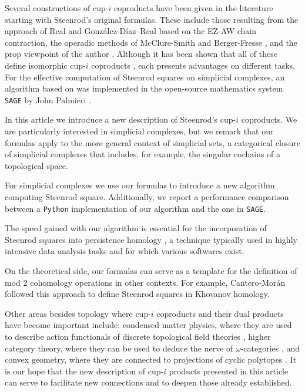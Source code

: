 Several constructions of cup-$i$ coproducts have been given in the literature starting with Steenrod's original formulas.
These include those resulting from the approach of Real \cite{real1996computability} and Gonz\'alez-D\'iaz--Real \cite{gonzalez1999combinatorial, gonzalez2003computation, gonzalez2005hpt} based on the EZ-AW chain contraction, the operadic methods of McClure-Smith \cite{mcclure03cochain} and Berger-Fresse \cite{berger04combinatorial}, and the prop viewpoint of the author \cite{medina2020prop1, medina2018prop2}.
Although it has been shown that all of these define isomorphic cup-$i$ coproducts \cite{medina2018axiomatic}, each presents advantages on different tasks.
For the effective computation of Steenrod squares on simplicial complexes, an algorithm based on \cite{gonzalez1999combinatorial} was implemented in the open-source mathematics system \verb|SAGE| by John Palmieri \cite{sagemath}.

In this article we introduce a new description of Steenrod's cup-$i$ coproducts.
We are particularly interested in simplicial complexes, but we remark that our formulas apply to the more general context of simplicial sets, a categorical closure of simplicial complexes that includes, for example, the singular cochains of a topological space.

For simplicial complexes we use our formulas to introduce a new algorithm computing Steenrod square.
Additionally, we report a performance comparison between a \verb|Python| implementation of our algorithm and the one in \verb|SAGE|.

The speed gained with our algorithm is essential for the incorporation of Steenrod squares into persistence homology \cite{medina2018persistence}, a technique typically used in highly intensive data analysis tasks \cite{carlsson2008images, carlsson2013viral, lee2018nanoporous} and for which various softwares \cite{bauer2019ripser, gudhi, medina2020giottotda} exist.

On the theoretical side, our formulas can serve as a template for the definition of mod 2 cohomology operations in other contexts.
For example, Cantero-Mor\'an \cite{cantero2020khovanov} followed this approach to define Steenrod squares in Khovanov homology.

Other areas besides topology where cup-$i$ coproducts and their dual products have become important include: condensed matter physics, where they are used to describe action functionals of discrete topological field theories \cite{gaiotto2016spin, bhardwaj2017state, kapustin2017fermionic}, higher category theory, where they can be used to deduce the nerve of $\omega$-categories \cite{medina2020globular}, and convex geometry, where they are connected to projections of cyclic polytopes \cite{kapranov1991combinatorial}.
It is our hope that the new description of cup-$i$ products presented in this article can serve to facilitate new connections and to deepen those already established.

